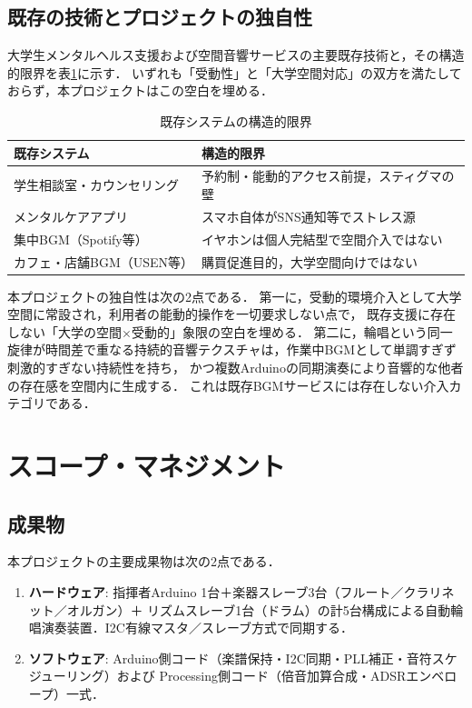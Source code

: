 \documentclass[lualatex,book,paper=a4paper,jafontsize=11.5pt,jafontscale=1.05]{jlreq}
\begin{document}
\subsection{既存の技術とプロジェクトの独自性}
大学生メンタルヘルス支援および空間音響サービスの主要既存技術と，その構造的限界を表\ref{tab:existing}に示す．
いずれも「受動性」と「大学空間対応」の双方を満たしておらず，本プロジェクトはこの空白を埋める．

\begin{table}[h]
\centering
\caption{既存システムの構造的限界}
\label{tab:existing}
\begin{tabular}{|l|l|}
\hline
\textbf{既存システム} & \textbf{構造的限界} \\
\hline
学生相談室・カウンセリング & 予約制・能動的アクセス前提，スティグマの壁 \\
メンタルケアアプリ & スマホ自体がSNS通知等でストレス源 \\
集中BGM（Spotify等） & イヤホンは個人完結型で空間介入ではない \\
カフェ・店舗BGM（USEN等） & 購買促進目的，大学空間向けではない \\
\hline
\end{tabular}
\end{table}

本プロジェクトの独自性は次の2点である．
第一に，受動的環境介入として大学空間に常設され，利用者の能動的操作を一切要求しない点で，
既存支援に存在しない「大学の空間$\times$受動的」象限の空白を埋める．
第二に，輪唱という同一旋律が時間差で重なる持続的音響テクスチャは，作業中BGMとして単調すぎず刺激的すぎない持続性を持ち，
かつ複数Arduinoの同期演奏により音響的な他者の存在感を空間内に生成する．
これは既存BGMサービスには存在しない介入カテゴリである．

\section{スコープ・マネジメント}
\subsection{成果物}
本プロジェクトの主要成果物は次の2点である．
\begin{enumerate}
    \item \textbf{ハードウェア}: 指揮者Arduino 1台＋楽器スレーブ3台（フルート／クラリネット／オルガン）＋
    リズムスレーブ1台（ドラム）の計5台構成による自動輪唱演奏装置．I2C有線マスタ／スレーブ方式で同期する．
    \item \textbf{ソフトウェア}: Arduino側コード（楽譜保持・I2C同期・PLL補正・音符スケジューリング）および
    Processing側コード（倍音加算合成・ADSRエンベロープ）一式．
\end{enumerate}
\end{document}
